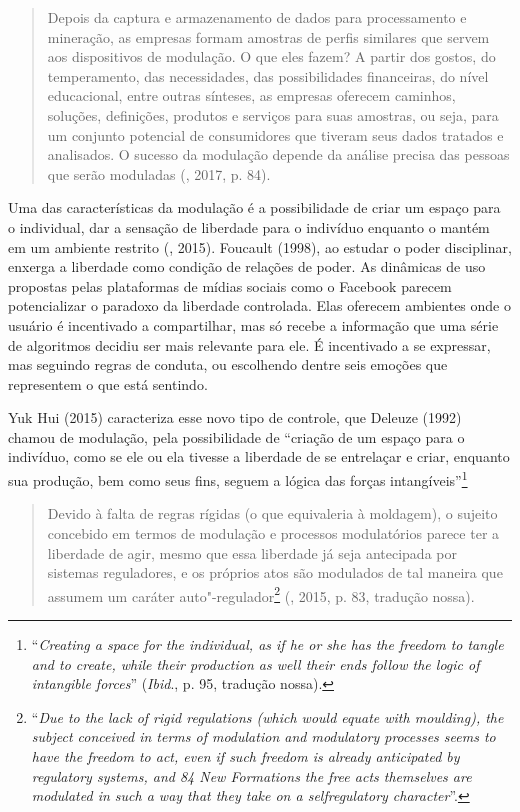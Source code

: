 \begin{quote}
Depois da captura e armazenamento de dados para processamento e
mineração, as empresas formam amostras de perfis similares que servem
aos dispositivos de modulação. O que eles fazem? A partir dos gostos, do
temperamento, das necessidades, das possibilidades financeiras, do nível
educacional, entre outras sínteses, as empresas oferecem caminhos,
soluções, definições, produtos e serviços para suas amostras, ou seja,
para um conjunto potencial de consumidores que tiveram seus dados
tratados e analisados. O sucesso da modulação depende da análise precisa
das pessoas que serão moduladas (, 2017, p. 84).
\end{quote}

Uma das características da modulação é a possibilidade de criar um
espaço para o individual, dar a sensação de liberdade para o indivíduo
enquanto o mantém em um ambiente restrito (, 2015).
Foucault (1998), ao estudar o poder disciplinar, enxerga a liberdade como condição de
relações de poder. As dinâmicas de uso propostas pelas plataformas de
mídias sociais como o Facebook parecem potencializar o paradoxo da
liberdade controlada. Elas oferecem ambientes onde o usuário é
incentivado a compartilhar, mas só recebe a informação que uma série de
algoritmos decidiu ser mais relevante para ele. É incentivado a se
expressar, mas seguindo regras de conduta, ou escolhendo dentre seis
emoções que representem o que está sentindo.

Yuk Hui (2015) caracteriza esse novo tipo de controle, que Deleuze
(1992) chamou de modulação, pela possibilidade de ``criação de um espaço
para o indivíduo, como se ele ou ela tivesse a liberdade de se
entrelaçar e criar, enquanto sua produção, bem como seus fins, seguem a
lógica das forças intangíveis''\footnote{``\emph{Creating a space for the
  individual, as if he or she has the freedom to tangle and to create,
  while their production as well their ends follow the logic of
  intangible forces}'' (\emph{Ibid}., p. 95, tradução nossa).}

\begin{quote}
Devido à falta de regras rígidas (o que equivaleria à moldagem), o
sujeito concebido em termos de modulação e processos modulatórios parece
ter a liberdade de agir, mesmo que essa liberdade já seja antecipada por
sistemas reguladores, e os próprios atos são modulados de tal maneira
que assumem um caráter auto"-regulador\footnote{``\emph{Due to the lack of
  rigid regulations (which would equate with moulding), the subject
  conceived in terms of modulation and modulatory processes seems to
  have the freedom to act, even if such freedom is already anticipated
  by regulatory systems, and 84 New Formations the free acts themselves
  are modulated in such a way that they take on a selfregulatory
  character}''.}
 (, 2015, p. 83, tradução nossa).
\end{quote}

